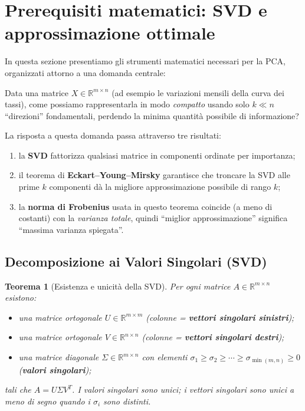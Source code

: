 \documentclass[11pt,a4paper]{article}
\theoremstyle{plain}
\newtheorem{teorema}{Teorema}[section]
\theoremstyle{definition}
\theoremstyle{remark}
\begin{document}
\section{Prerequisiti matematici: SVD e approssimazione ottimale}

In questa sezione presentiamo gli strumenti matematici necessari per la PCA,
organizzati attorno a una domanda centrale:

\begin{keybox}
Data una matrice $X \in \mathbb{R}^{m \times n}$ (ad esempio le variazioni
mensili della curva dei tassi), come possiamo rappresentarla in modo
\emph{compatto} usando solo $k \ll n$ ``direzioni'' fondamentali, perdendo
la minima quantità possibile di informazione?
\end{keybox}

La risposta a questa domanda passa attraverso tre risultati:
\begin{enumerate}
  \item la \textbf{SVD} fattorizza qualsiasi matrice in componenti ordinate
        per importanza;
  \item il teorema di \textbf{Eckart--Young--Mirsky} garantisce che troncare
        la SVD alle prime $k$ componenti dà la migliore approssimazione
        possibile di rango $k$;
  \item la \textbf{norma di Frobenius} usata in questo teorema coincide
        (a meno di costanti) con la \emph{varianza totale}, quindi
        ``miglior approssimazione'' significa ``massima varianza spiegata''.
\end{enumerate}

\medskip

\subsection{Decomposizione ai Valori Singolari (SVD)}

\begin{teorema}[Esistenza e unicità della SVD]
\label{thm:svd}
Per ogni matrice $A \in \mathbb{R}^{m \times n}$ esistono:
\begin{itemize}
  \item una matrice ortogonale $U \in \mathbb{R}^{m \times m}$ (colonne = \textbf{vettori singolari sinistri});
  \item una matrice ortogonale $V \in \mathbb{R}^{n \times n}$ (colonne = \textbf{vettori singolari destri});
  \item una matrice diagonale $\Sigma \in \mathbb{R}^{m \times n}$ con elementi
        $\sigma_1 \geq \sigma_2 \geq \cdots \geq \sigma_{\min(m,n)} \geq 0$
        (\textbf{valori singolari});
\end{itemize}
tali che $A = U \Sigma V^T$. I valori singolari sono unici; i vettori singolari
sono unici a meno di segno quando i $\sigma_i$ sono distinti.
\end{teorema}
\end{document}
